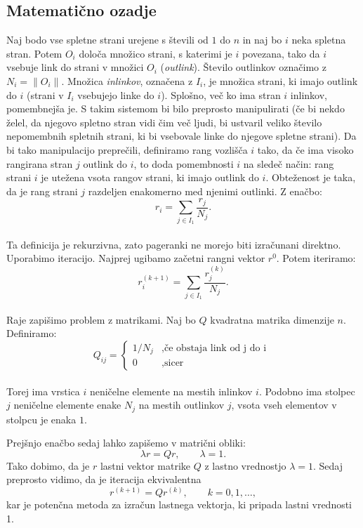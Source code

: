 \documentclass[12pt,a4paper]{amsart}
\begin{document}
\subsection{Matematično ozadje}
Naj bodo vse spletne strani urejene s števili od $1$ do $n$ in naj bo $i$ neka spletna stran. Potem $O_i$ določa množico strani, s katerimi je $i$ povezana, tako da $i$ vsebuje link do strani v množici $O_i$ (\textit{outlink}). Število outlinkov označimo z $N_i = \|O_i\|$. Množica \textit{inlinkov}, označena z $I_i$, je množica strani, ki imajo outlink do $i$ (strani v $I_i$ vsebujejo linke do $i$).
Splošno, več ko ima stran $i$ inlinkov, pomembnejša je. S takim sistemom bi bilo preprosto manipulirati (če bi nekdo želel, da njegovo spletno stran vidi čim več ljudi, bi ustvaril veliko število nepomembnih spletnih strani, ki bi vsebovale linke do njegove spletne strani). Da bi tako manipulacijo preprečili, definiramo rang vozlišča $i$ tako, da če ima visoko rangirana stran $j$ outlink do $i$, to doda pomembnosti $i$ na sledeč način: rang strani $i$ je utežena vsota rangov strani, ki imajo outlink do $i$. Obteženost  je taka, da je rang strani $j$ razdeljen enakomerno med njenimi outlinki. Z enačbo: $$r_i = \sum_{j \in I_1} \frac{r_j}{N_j}.$$ \\
Ta definicija je rekurzivna, zato pageranki ne morejo biti izračunani direktno. Uporabimo iteracijo. Najprej ugibamo začetni rangni vektor $r^0$. Potem iteriramo:
$$r_i^{(k+1)} = \sum_{j \in I_1} \frac{r_j^{(k)}}{N_j}.$$ 
\\
Raje zapišimo problem z matrikami. Naj bo $Q$ kvadratna matrika dimenzije $n$. Definiramo:
\[
Q_{ij} = 
\left \{
	\begin{array}{ll}
		1/N_j  &, \mbox{če obstaja link od j do i }  \\
		0 &, \mbox{sicer} 
	\end{array}
\right. \]
\\
Torej ima vrstica $i$ neničelne elemente na mestih inlinkov $i$. Podobno ima stolpec $j$ neničelne elemente enake $N_j$ na mestih  outlinkov $j$, vsota vseh elementov v stolpcu je enaka $1$.

Prejšnjo enačbo sedaj lahko zapišemo v matrični obliki:
$$ \lambda r = Qr,     \qquad \lambda = 1.$$
Tako dobimo, da je $r$ lastni vektor matrike $Q$ z lastno vrednostjo $\lambda = 1$. Sedaj preprosto vidimo, da je iteracija ekvivalentna
$$r^{(k+1)} = Qr^{(k)},\qquad  k=0,1,… ,$$
kar je potenčna metoda za izračun lastnega vektorja, ki pripada lastni vrednosti 1.\\
\end{document}
